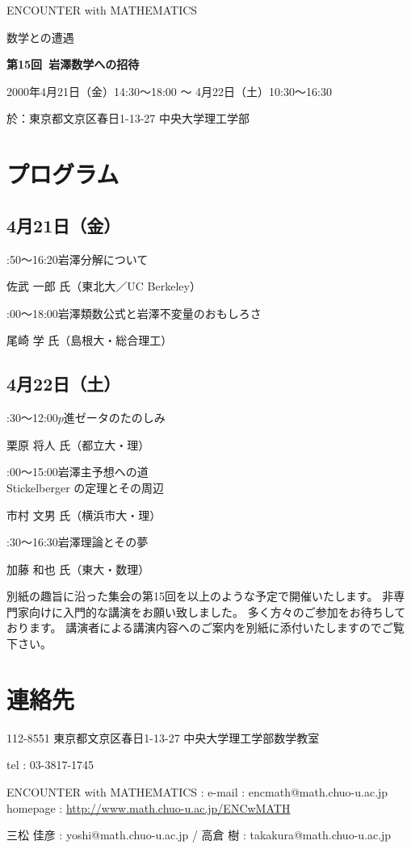 \documentclass[uplatex,dvipdfmx]{jlreq}
\newcommand{\talk}[3]{%
\noindent
#1\quad #2\par
\hspace*{2em}#3\par\smallskip
}
\newcommand{\EwMnumber}{第15回}
\newcommand{\EwMtitle}{岩澤数学への招待}
\newcommand{\EwMdate}{2000年4月21日（金）14:30～18:00 ～ 4月22日（土）10:30～16:30}
\newcommand{\EwMplace}{東京都文京区春日1-13-27 中央大学理工学部}
\newcommand{\EwMtitleblock}{

\vspace*{-5mm}

\begin{center}

{\Large ENCOUNTER with MATHEMATICS}

\vspace{2mm}

{\large 数学との遭遇}

\vspace{4mm}

{\Large \bfseries \EwMnumber\ \EwMtitle}

\vspace{4mm}

\EwMdate

\vspace{2mm}

於：\EwMplace

\end{center}

\vspace{2mm}

}
\begin{document}
\EwMtitleblock


\section*{プログラム}

\subsection*{4月21日（金）}

\talk
{14:50～16:20}
{岩澤分解について}
{佐武 一郎 氏（東北大／UC Berkeley）}

\talk
{17:00～18:00}
{岩澤類数公式と岩澤不変量のおもしろさ}
{尾崎 学 氏（島根大・総合理工）}

\subsection*{4月22日（土）}

\talk
{10:30～12:00}
{$p$進ゼータのたのしみ}
{栗原 将人 氏（都立大・理）}

\talk
{14:00～15:00}
{岩澤主予想への道\\[1mm]Stickelberger の定理とその周辺}
{市村 文男 氏（横浜市大・理）}

\talk
{15:30～16:30}
{岩澤理論とその夢}
{加藤 和也 氏（東大・数理）}


\bigskip

別紙の趣旨に沿った集会の第15回を以上のような予定で開催いたします。  
非専門家向けに入門的な講演をお願い致しました。  
多く方々のご参加をお待ちしております。  
講演者による講演内容へのご案内を別紙に添付いたしますのでご覧下さい。


\section*{連絡先}

112-8551 東京都文京区春日1-13-27 中央大学理工学部数学教室 

tel : 03-3817-1745  

ENCOUNTER with MATHEMATICS : e-mail : encmath@math.chuo-u.ac.jp  
homepage : \url{http://www.math.chuo-u.ac.jp/ENCwMATH}  

三松 佳彦 : yoshi@math.chuo-u.ac.jp / 高倉 樹 : takakura@math.chuo-u.ac.jp
\end{document}
